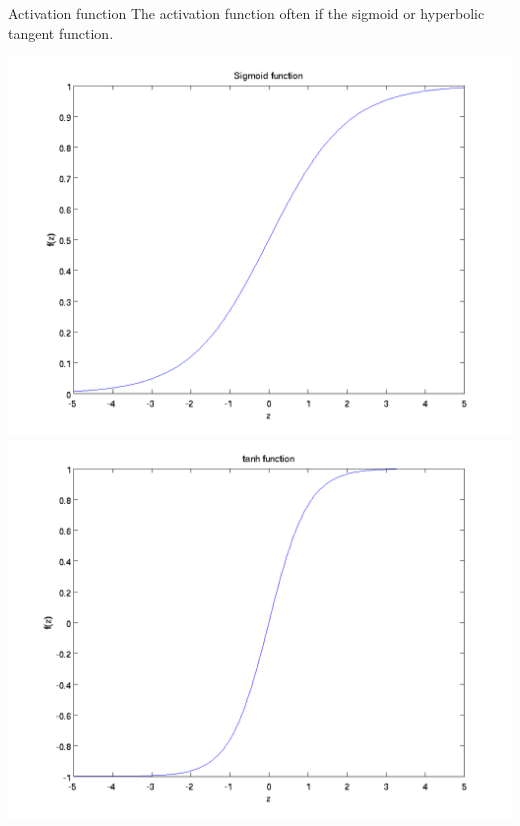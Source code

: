 \documentclass{beamer}
\begin{document}
\begin{frame}{Activation function}
	The activation function often if the sigmoid or hyperbolic tangent function.
	\begin{center}
		\includegraphics[scale=0.28]{images/sigmoid.png}
		\includegraphics[scale=0.28]{images/tanh.png}
	\end{center}
\end{frame}
\end{document}
